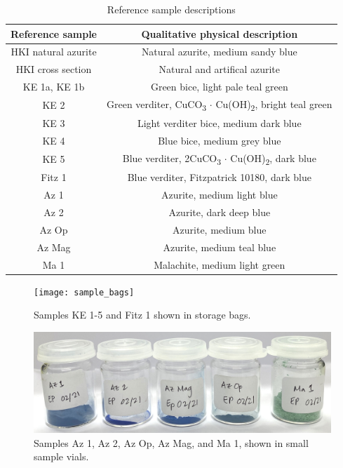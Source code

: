 \begin{table}[H]
\caption{Reference sample descriptions}
\centering
\label{table:ref_sample}
\begin{tabular}{c c}
\toprule
Reference sample & Qualitative physical description \\
\midrule
HKI natural azurite & Natural azurite, medium sandy blue \\
HKI cross section & Natural and artifical azurite \\
KE 1a, KE 1b & Green bice, light pale teal green \\
KE 2 & Green verditer, CuCO\textsubscript{3} $\cdot$ Cu(OH)\textsubscript{2}, bright teal green \\
KE 3 & Light verditer bice, medium dark blue \\
KE 4 & Blue bice, medium grey blue \\
KE 5 & Blue verditer, 2CuCO\textsubscript{3} $\cdot$ Cu(OH)\textsubscript{2}, dark blue \\
Fitz 1 & Blue verditer, Fitzpatrick 10180, dark blue \\
Az 1 & Azurite, medium light blue \\
Az 2 & Azurite, dark deep blue \\
Az Op & Azurite, medium blue \\
Az Mag & Azurite, medium teal blue \\
Ma 1 & Malachite, medium light green \\
\bottomrule
\end{tabular}
\end{table}

\begin{figure}[H]
\centering
  \texttt{[image: sample\_bags]}
\caption[Samples KE 1-5 and Fitz 1.]{Samples KE 1-5 and Fitz 1 shown in storage bags.}
\label{fig:sample_bags}
\end{figure}

\begin{figure}[H]
\centering
  \includegraphics[width=0.75\linewidth]{sample_vials}
\caption[Samples Az 1, Az 2, Az Op, Az Mag, and Ma 1.]{Samples Az 1, Az 2, Az Op, Az Mag, and Ma 1, shown in small sample vials.}
\label{fig:sample_vials}
\end{figure}

